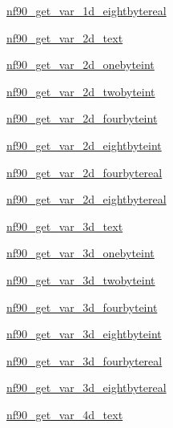\begin{DoxyCompactItemize}
\item 
\hyperlink{interfacenf90__get__var_a24ddca286d07e1d37131110a6b81d83a}{nf90\+\_\+get\+\_\+var\+\_\+1d\+\_\+eightbytereal}
\item 
\hyperlink{interfacenf90__get__var_aad13d6317a193749fff67477463e7465}{nf90\+\_\+get\+\_\+var\+\_\+2d\+\_\+text}
\item 
\hyperlink{interfacenf90__get__var_af15494c075dcbe5eb48f662dda5cb0f1}{nf90\+\_\+get\+\_\+var\+\_\+2d\+\_\+onebyteint}
\item 
\hyperlink{interfacenf90__get__var_a2c361fc7cced61f1e4b5d424350dbf87}{nf90\+\_\+get\+\_\+var\+\_\+2d\+\_\+twobyteint}
\item 
\hyperlink{interfacenf90__get__var_a2e6eb51fb24ffa451ee5bc2c888bad7d}{nf90\+\_\+get\+\_\+var\+\_\+2d\+\_\+fourbyteint}
\item 
\hyperlink{interfacenf90__get__var_a2ea8f3c2c4a60a241a872f06ddb8d845}{nf90\+\_\+get\+\_\+var\+\_\+2d\+\_\+eightbyteint}
\item 
\hyperlink{interfacenf90__get__var_a3e1fb1a8ae8a5db3b7c881501ea58e07}{nf90\+\_\+get\+\_\+var\+\_\+2d\+\_\+fourbytereal}
\item 
\hyperlink{interfacenf90__get__var_a0cca7bd547ed022f2c7fef374693aed1}{nf90\+\_\+get\+\_\+var\+\_\+2d\+\_\+eightbytereal}
\item 
\hyperlink{interfacenf90__get__var_aba87dda8aedeac82efb0e1e7bbc814bd}{nf90\+\_\+get\+\_\+var\+\_\+3d\+\_\+text}
\item 
\hyperlink{interfacenf90__get__var_ad7a7046e1060af042a9a0aae57adbc98}{nf90\+\_\+get\+\_\+var\+\_\+3d\+\_\+onebyteint}
\item 
\hyperlink{interfacenf90__get__var_ac77020650ecc358bb2805efe6c8c1d4f}{nf90\+\_\+get\+\_\+var\+\_\+3d\+\_\+twobyteint}
\item 
\hyperlink{interfacenf90__get__var_a0454732f832e5cc4f2b99073111a79fd}{nf90\+\_\+get\+\_\+var\+\_\+3d\+\_\+fourbyteint}
\item 
\hyperlink{interfacenf90__get__var_a80679546fe6cad4040f0944051d73457}{nf90\+\_\+get\+\_\+var\+\_\+3d\+\_\+eightbyteint}
\item 
\hyperlink{interfacenf90__get__var_aa8b85b887389bb5e3af74293f8ec5040}{nf90\+\_\+get\+\_\+var\+\_\+3d\+\_\+fourbytereal}
\item 
\hyperlink{interfacenf90__get__var_ab3c80bc6145b486021ad4c95862872c9}{nf90\+\_\+get\+\_\+var\+\_\+3d\+\_\+eightbytereal}
\item 
\hyperlink{interfacenf90__get__var_ad6d5533c0faaf292bd292ecbd4a16e2f}{nf90\+\_\+get\+\_\+var\+\_\+4d\+\_\+text}

\end{DoxyCompactItemize}
